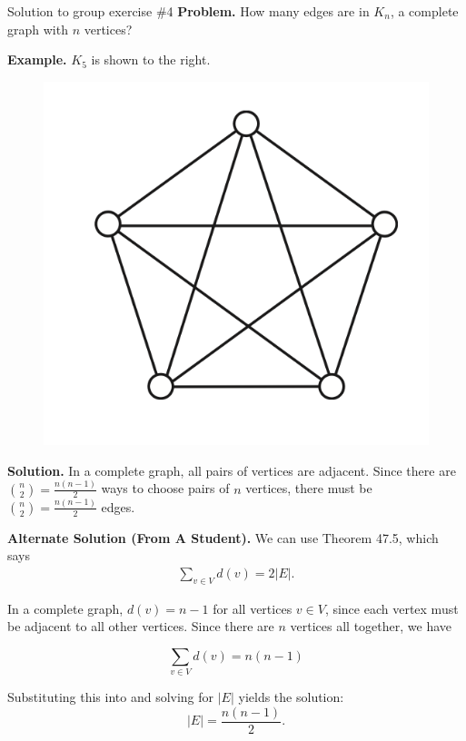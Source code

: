 \documentclass[10pt]{beamer}
\begin{document}
\begin{frame}{Solution to group exercise \#4}
\footnotesize 
\textbf{Problem.} How many edges are in $K_n$, a complete graph with $n$ vertices?

\vfill 
\begin{minipage}{0.4\textwidth}
\textbf{Example.} $K_5$ is shown to the right.
\end{minipage} %
\hfill
\begin{minipage}{0.55\textwidth}
\begin{figure}
\includegraphics[width=.3\linewidth]{images/complete_graph.png}	
\end{figure}
\end{minipage} 

\vfill 

\textbf{Solution.} In a complete graph, all pairs of vertices are adjacent.  Since there are $\binom{n}{2} = \frac{n(n-1)}{2}$ ways to choose pairs of $n$ vertices, there must be $\binom{n}{2} = \frac{n(n-1)}{2}$ edges.

\vfill 

\textbf{Alternate Solution (From A Student).} We can use Theorem 47.5, which says
%
\begin{align}
\sum_{v \in V} d(v) = 2 |E|. 
\label{eqn:sum_of_degrees_gives_twice_the_edges}
\end{align}

In a complete graph, $d(v) = n-1$ for all vertices $v \in V$, since each vertex must be adjacent to all other vertices. Since there are $n$ vertices all together, we have

\[ \sum_{v \in V} d(v) =  n(n-1)  \]

Substituting this into  and solving for $|E|$ yields the solution:
\[ |E| =   \frac{n(n-1)}{2}.\]


\end{frame}
\end{document}
